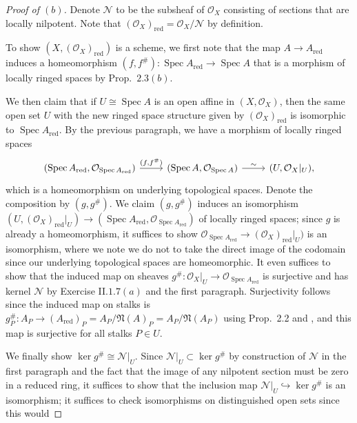 \documentclass[10pt]{article}
\theoremstyle{definition}
\theoremstyle{remark}
\numberwithin{equation}{section}
\numberwithin{figure}{subsubsection}
\DeclareMathOperator{\Spec}{Spec}
\newcommand{\OO}{\mathcal{O}}
\newcommand{\red}{\mathrm{red}}
\begin{document}
\begin{proof}[Proof of $(b)$]
  Denote $\mathscr{N}$ to be the subsheaf of $\OO_X$ consisting of sections that
  are locally nilpotent. Note that $(\OO_X)_\red = \OO_X/\mathscr{N}$ by
  definition.
  \par To show $(X,(\OO_X)_\red)$ is a scheme, we first note that the map
  $A \to A_\red$ induces a homeomorphism $(f,f^\#)\colon\Spec A_\red \to \Spec A$
  \cite[Exc.\ 1.21]{AM69} that is a morphism of locally ringed spaces by
  Prop.~$2.3(b)$.
  \par We then claim that if $U \cong \Spec A$ is an open affine in $(X,\OO_X)$,
  then the same open set $U$ with the new ringed space structure given by
  $(\OO_X)_\red$ is isomorphic to $\Spec A_\red$. By the previous paragraph,
  we have a morphism of locally ringed spaces
  \begin{equation*}
    \begin{tikzcd}
      (\Spec A_\red,\OO_{\Spec A_\red}) \rar{(f,f^\#)} &
      (\Spec A,\OO_{\Spec A}) \rar{\sim} & (U,\OO_X\rvert_U),
    \end{tikzcd}
  \end{equation*}
  which is a homeomorphism on underlying topological spaces. Denote the
  composition by $(g,g^\#)$. We claim $(g,g^\#)$ induces an isomorphism
  $(U,(\OO_{X})_\red\rvert_U) \to (\Spec A_\red,\OO_{\Spec A_\red})$ of locally
  ringed spaces; since $g$ is already a homeomorphism, it suffices to show
  $\OO_{\Spec A_\red} \to (\OO_{X})_\red\rvert_U)$ is an isomorphism, where we
  note we do not to take the direct image of the codomain since our underlying
  topological spaces are homeomorphic. It even suffices to show
  that the induced map on sheaves $g^\#\colon\OO_X\rvert_U \to \OO_{\Spec A_\red}$ is
  surjective and has kernel $\mathscr{N}$ by Exercise II.$1.7(a)$ and the first
  paragraph. Surjectivity
  follows since the induced map on stalks is $g^\#_P\colon A_P \to (A_\red)_P =
  A_P/\mathfrak{N}(A)_P = A_P/\mathfrak{N}(A_P)$ using Prop.\ 2.2 and 
  \cite[Cor.\ 3.12]{AM69}, and this map is surjective for all stalks $P \in U$.
  \par We finally show $\ker g^\# \cong \mathscr{N}\rvert_U$. Since
  $\mathscr{N}\rvert_U \subset \ker g^\#$ by construction of $\mathscr{N}$ in
  the first paragraph and the fact that the image of any nilpotent section must
  be zero in a reduced ring, it suffices to show that the inclusion map
  $\mathscr{N}\rvert_U \hookrightarrow \ker g^\#$ is an isomorphism;
  it suffices to check isomorphisms on distinguished open sets since this would

\end{proof}
\end{document}
